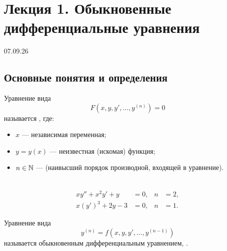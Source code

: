 \section{Лекция 1. Обыкновенные дифференциальные уравнения}

\begin{flushright}
    07.09.26
\end{flushright}

\subsection{Основные понятия и определения}

\begin{definition}
    Уравнение вида
    \begin{equation} \label{eq:l1_ode_gen}
        F\left(x, y, y', \dots, y^{(n)}\right) = 0 \tag{1}
    \end{equation}
    называется , где:
    \begin{itemize}
        \item $x$ — независимая переменная;
        \item $y = y(x)$ — неизвестная (искомая) функция;
        \item $n \in \mathbb{N}$ —  (наивысший порядок
        производной, входящей в уравнение).
    \end{itemize}
\end{definition}

\begin{example} ~
    \begin{align*}
        x y'' + x^2 y' + y &= 0, & n &= 2, \\
        x (y')^3 + 2y - 3 &= 0, & n &= 1.
    \end{align*}
\end{example}

\begin{definition}
    Уравнение вида
    \begin{equation} \label{eq:l1_ode_res}
        y^{(n)} = f\left(x, y, y', \dots, y^{(n-1)}\right) \tag{2}
    \end{equation}
    называется обыкновенным дифференциальным уравнением,
    .
\end{definition}

